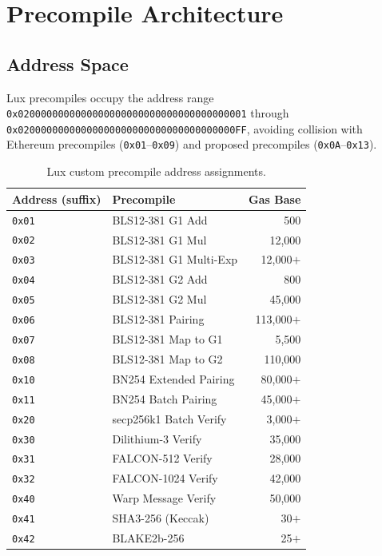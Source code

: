 \section{Precompile Architecture}
\label{sec:architecture}

\subsection{Address Space}

Lux precompiles occupy the address range \texttt{0x0200000000000000000000000000000000000001} through \texttt{0x02000000000000000000000000000000000000FF}, avoiding collision with Ethereum precompiles (\texttt{0x01}--\texttt{0x09}) and proposed precompiles (\texttt{0x0A}--\texttt{0x13}).

\begin{table}[H]
\centering
\caption{Lux custom precompile address assignments.}
\label{tab:addresses}
\begin{tabular}{llr}
\toprule
\textbf{Address (suffix)} & \textbf{Precompile} & \textbf{Gas Base} \\
\midrule
\texttt{0x01} & BLS12-381 G1 Add & 500 \\
\texttt{0x02} & BLS12-381 G1 Mul & 12,000 \\
\texttt{0x03} & BLS12-381 G1 Multi-Exp & 12,000$+$ \\
\texttt{0x04} & BLS12-381 G2 Add & 800 \\
\texttt{0x05} & BLS12-381 G2 Mul & 45,000 \\
\texttt{0x06} & BLS12-381 Pairing & 113,000$+$ \\
\texttt{0x07} & BLS12-381 Map to G1 & 5,500 \\
\texttt{0x08} & BLS12-381 Map to G2 & 110,000 \\
\texttt{0x10} & BN254 Extended Pairing & 80,000$+$ \\
\texttt{0x11} & BN254 Batch Pairing & 45,000$+$ \\
\texttt{0x20} & secp256k1 Batch Verify & 3,000$+$ \\
\texttt{0x30} & Dilithium-3 Verify & 35,000 \\
\texttt{0x31} & FALCON-512 Verify & 28,000 \\
\texttt{0x32} & FALCON-1024 Verify & 42,000 \\
\texttt{0x40} & Warp Message Verify & 50,000 \\
\texttt{0x41} & SHA3-256 (Keccak) & 30$+$ \\
\texttt{0x42} & BLAKE2b-256 & 25$+$ \\
\bottomrule
\end{tabular}
\end{table}

